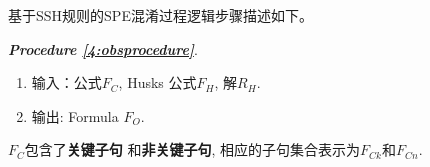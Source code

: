%
%
%
%
%

基于SSH规则的SPE混淆过程逻辑步骤描述如下。

\textit{\textbf{Procedure \ref{4:obsprocedure}}}.
\begin{enumerate}
\item[]\label{4:obsprocedure} 输入：公式$F_C$, Husks 公式$F_H$, 解$R_H$.
\item[] 输出: Formula $F_O$.
\end{enumerate}
$F_C$包含了\textbf{关键子句}
和\textbf{非关键子句},
相应的子句集合表示为\textbf{$F_{Ck}$}和\textbf{$F_{Cn}$}.

